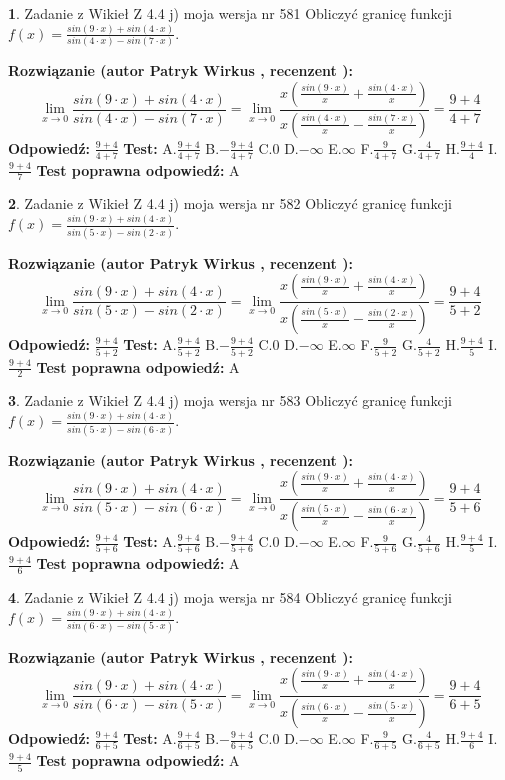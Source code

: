 \documentclass[12pt, a4paper]{article}
\theoremstyle{definition} %
\newtheorem{zad}{}
\newcommand{\zadStart}[1]{\begin{zad}#1\newline}
\newcommand{\zadStop}{\end{zad}}
\newcommand{\rozwStart}[2]{\noindent \textbf{Rozwiązanie (autor #1 , recenzent #2): }\newline}
\newcommand{\rozwStop}{\newline}
\newcommand{\odpStart}{\noindent \textbf{Odpowiedź:}\newline}
\newcommand{\odpStop}{\newline}
\newcommand{\testStart}{\noindent \textbf{Test:}\newline}
\newcommand{\testStop}{\newline}
\newcommand{\kluczStart}{\noindent \textbf{Test poprawna odpowiedź:}\newline}
\newcommand{\kluczStop}{\newline}
\begin{document}
\zadStart{Zadanie z Wikieł Z 4.4 j) moja wersja nr 581}
Obliczyć granicę funkcji $f(x)=\frac{sin(9\cdot x) +sin(4\cdot x)}{sin(4\cdot x) -sin(7\cdot x)}$.
\zadStop
\rozwStart{Patryk Wirkus}{}
$$\lim\limits_{x\to 0}\frac{sin(9\cdot x) +sin(4\cdot x)}{sin(4\cdot x) -sin(7\cdot x)}=\lim\limits_{x\to 0}\frac{x(\frac{sin(9\cdot x)}{x}+\frac{sin(4\cdot x)}{x})}{x(\frac{sin(4\cdot x)}{x}-\frac{sin(7\cdot x)}{x})}=\frac{9+4}{4+7}$$
\rozwStop
\odpStart
$\frac{9+4}{4+7}$
\odpStop
\testStart
A.$\frac{9+4}{4+7}$
B.$-\frac{9+4}{4+7}$
C.$0$
D.$-\infty$
E.$\infty$
F.$\frac{9}{4+7}$
G.$\frac{4}{4+7}$
H.$\frac{9+4}{4}$
I.$\frac{9+4}{7}$
\testStop
\kluczStart
A
\kluczStop



\zadStart{Zadanie z Wikieł Z 4.4 j) moja wersja nr 582}
Obliczyć granicę funkcji $f(x)=\frac{sin(9\cdot x) +sin(4\cdot x)}{sin(5\cdot x) -sin(2\cdot x)}$.
\zadStop
\rozwStart{Patryk Wirkus}{}
$$\lim\limits_{x\to 0}\frac{sin(9\cdot x) +sin(4\cdot x)}{sin(5\cdot x) -sin(2\cdot x)}=\lim\limits_{x\to 0}\frac{x(\frac{sin(9\cdot x)}{x}+\frac{sin(4\cdot x)}{x})}{x(\frac{sin(5\cdot x)}{x}-\frac{sin(2\cdot x)}{x})}=\frac{9+4}{5+2}$$
\rozwStop
\odpStart
$\frac{9+4}{5+2}$
\odpStop
\testStart
A.$\frac{9+4}{5+2}$
B.$-\frac{9+4}{5+2}$
C.$0$
D.$-\infty$
E.$\infty$
F.$\frac{9}{5+2}$
G.$\frac{4}{5+2}$
H.$\frac{9+4}{5}$
I.$\frac{9+4}{2}$
\testStop
\kluczStart
A
\kluczStop



\zadStart{Zadanie z Wikieł Z 4.4 j) moja wersja nr 583}
Obliczyć granicę funkcji $f(x)=\frac{sin(9\cdot x) +sin(4\cdot x)}{sin(5\cdot x) -sin(6\cdot x)}$.
\zadStop
\rozwStart{Patryk Wirkus}{}
$$\lim\limits_{x\to 0}\frac{sin(9\cdot x) +sin(4\cdot x)}{sin(5\cdot x) -sin(6\cdot x)}=\lim\limits_{x\to 0}\frac{x(\frac{sin(9\cdot x)}{x}+\frac{sin(4\cdot x)}{x})}{x(\frac{sin(5\cdot x)}{x}-\frac{sin(6\cdot x)}{x})}=\frac{9+4}{5+6}$$
\rozwStop
\odpStart
$\frac{9+4}{5+6}$
\odpStop
\testStart
A.$\frac{9+4}{5+6}$
B.$-\frac{9+4}{5+6}$
C.$0$
D.$-\infty$
E.$\infty$
F.$\frac{9}{5+6}$
G.$\frac{4}{5+6}$
H.$\frac{9+4}{5}$
I.$\frac{9+4}{6}$
\testStop
\kluczStart
A
\kluczStop



\zadStart{Zadanie z Wikieł Z 4.4 j) moja wersja nr 584}
Obliczyć granicę funkcji $f(x)=\frac{sin(9\cdot x) +sin(4\cdot x)}{sin(6\cdot x) -sin(5\cdot x)}$.
\zadStop
\rozwStart{Patryk Wirkus}{}
$$\lim\limits_{x\to 0}\frac{sin(9\cdot x) +sin(4\cdot x)}{sin(6\cdot x) -sin(5\cdot x)}=\lim\limits_{x\to 0}\frac{x(\frac{sin(9\cdot x)}{x}+\frac{sin(4\cdot x)}{x})}{x(\frac{sin(6\cdot x)}{x}-\frac{sin(5\cdot x)}{x})}=\frac{9+4}{6+5}$$
\rozwStop
\odpStart
$\frac{9+4}{6+5}$
\odpStop
\testStart
A.$\frac{9+4}{6+5}$
B.$-\frac{9+4}{6+5}$
C.$0$
D.$-\infty$
E.$\infty$
F.$\frac{9}{6+5}$
G.$\frac{4}{6+5}$
H.$\frac{9+4}{6}$
I.$\frac{9+4}{5}$
\testStop
\kluczStart
A
\kluczStop
\end{document}

